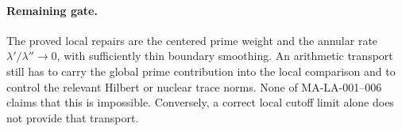 \paragraph{Remaining gate.}
The proved local repairs are the centered prime weight and the
annular rate $\lambda'/\lambda''\to0$, with sufficiently thin
boundary smoothing.  An arithmetic transport still has to carry
the global prime contribution into the local comparison and to
control the relevant Hilbert or nuclear trace norms.  None of
MA-LA-001--006 claims that this is impossible.  Conversely, a
correct local cutoff limit alone does not provide that transport.
